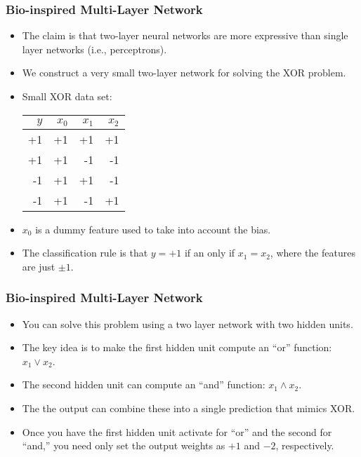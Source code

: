 \documentclass[trans]{beamer}
\begin{document}
\begin{frame}
  \frametitle{Bio-inspired Multi-Layer Network}
\begin{itemize}
\item
The claim is that two-layer neural networks are more expressive than
single layer networks (i.e., perceptrons).
\item We construct a very small two-layer network for solving the XOR problem.
\item
Small XOR data set:
\begin{tabular}{r|rrr}
  $y$ & $x_0$ & $x_1$ & $x_2$ \\
  \hline
  +1 & +1 & +1 & +1 \\
  +1 & +1 & -1 & -1 \\
  -1 & +1 & +1 & -1 \\
  -1 & +1 & -1 & +1
\end{tabular}
\item $x_0$ is a dummy feature used to take into account the bias.
\item The classification rule is
that $y=+1$ if an only if $x_1=x_2$, where the features are just $\pm
1$.
\end{itemize}
\end{frame}

\begin{frame}
  \frametitle{Bio-inspired Multi-Layer Network}
\begin{itemize}
\item
You can solve this problem using a two layer network with two hidden
units.
\item  The key idea is to make the first hidden unit compute an
``or'' function: $x_1 \lor x_2$. 
\item The second hidden unit can compute
an ``and'' function: $x_1 \land x_2$. 
\item The the output can combine
these into a single prediction that mimics XOR. 
\item  Once you have the
first hidden unit activate for ``or'' and the second for ``and,'' you
need only set the output weights as $+1$ and $-2$, respectively.
\end{itemize}
\end{frame}
\end{document}
